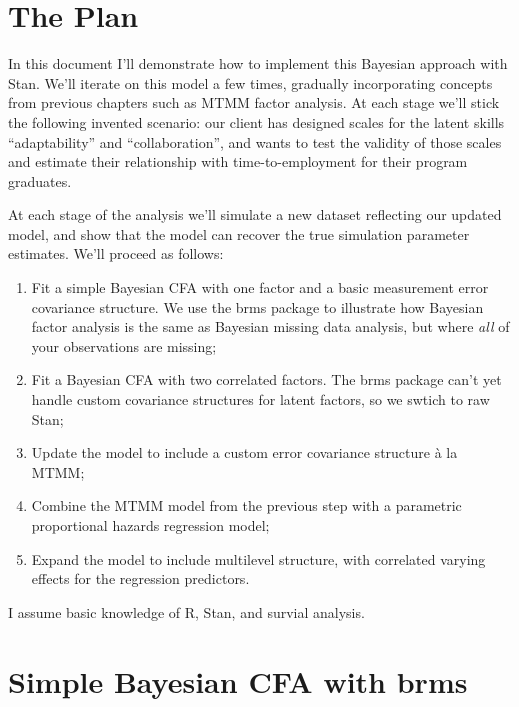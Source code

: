 \documentclass[
  letterpaper,
  DIV=11,
  numbers=noendperiod]{scrreprt}
\providecommand{\tightlist}{%
  \setlength{\itemsep}{0pt}\setlength{\parskip}{0pt}}\usepackage{longtable,booktabs,array}
\begin{document}
\hypertarget{the-plan}{%
\section{The Plan}\label{the-plan}}

In this document I'll demonstrate how to implement this Bayesian
approach with Stan. We'll iterate on this model a few times, gradually
incorporating concepts from previous chapters such as MTMM factor
analysis. At each stage we'll stick the following invented scenario: our
client has designed scales for the latent skills ``adaptability'' and
``collaboration'', and wants to test the validity of those scales and
estimate their relationship with time-to-employment for their program
graduates.

At each stage of the analysis we'll simulate a new dataset reflecting
our updated model, and show that the model can recover the true
simulation parameter estimates. We'll proceed as follows:

\begin{enumerate}
\def\labelenumi{\arabic{enumi}.}
\tightlist
\item
  Fit a simple Bayesian CFA with one factor and a basic measurement
  error covariance structure. We use the brms package to illustrate how
  Bayesian factor analysis is the same as Bayesian missing data
  analysis, but where \emph{all} of your observations are missing;
\item
  Fit a Bayesian CFA with two correlated factors. The brms package can't
  yet handle custom covariance structures for latent factors, so we
  swtich to raw Stan;
\item
  Update the model to include a custom error covariance structure à la
  MTMM;
\item
  Combine the MTMM model from the previous step with a parametric
  proportional hazards regression model;
\item
  Expand the model to include multilevel structure, with correlated
  varying effects for the regression predictors.
\end{enumerate}

I assume basic knowledge of R, Stan, and survial analysis.

\hypertarget{simple-bayesian-cfa-with-brms}{%
\section{Simple Bayesian CFA with
brms}\label{simple-bayesian-cfa-with-brms}}
\end{document}
